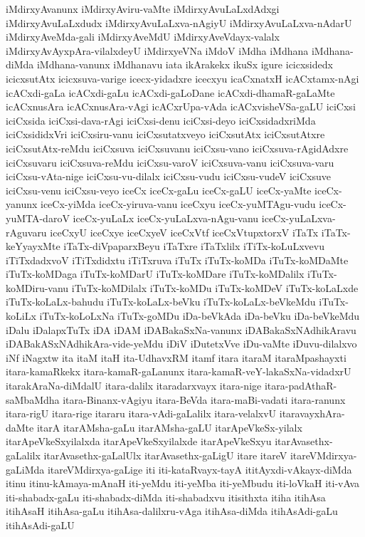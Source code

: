 {iMdirxyAvanunx
iMdirxyAviru-vaMte
iMdirxyAvuLaLxdAdxgi
iMdirxyAvuLaLxdudx
iMdirxyAvuLaLxva-nAgiyU
iMdirxyAvuLaLxva-nAdarU
iMdirxyAveMda-gali
iMdirxyAveMdU
iMdirxyAveVdayx-valalx
iMdirxyAvAyxpAra-vilalxdeyU
iMdirxyeVNa
iMdoV
iMdha
iMdhana
iMdhana-diMda
iMdhana-vanunx
iMdhanavu
iata
ikArakekx
ikuSx
igure
icicxsidedx
icicxsutAtx
icicxsuva-varige
icecx-yidadxre
icecxyu
icaCxnatxH
icACxtamx-nAgi
icACxdi-gaLa
icACxdi-gaLu
icACxdi-gaLoDane
icACxdi-dhamaR-gaLaMte
icACxnusAra
icACxnusAra-vAgi
icACxrUpa-vAda
icACxvisheVSa-gaLU
iciCxsi
iciCxsida
iciCxsi-dava-rAgi
iciCxsi-denu
iciCxsi-deyo
iciCxsidadxriMda
iciCxsididxVri
iciCxsiru-vanu
iciCxsutatxveyo
iciCxsutAtx
iciCxsutAtxre
iciCxsutAtx-reMdu
iciCxsuva
iciCxsuvanu
iciCxsu-vano
iciCxsuva-rAgidAdxre
iciCxsuvaru
iciCxsuva-reMdu
iciCxsu-varoV
iciCxsuva-vanu
iciCxsuva-varu
iciCxsu-vAta-nige
iciCxsu-vu-dilalx
iciCxsu-vudu
iciCxsu-vudeV
iciCxsuve
iciCxsu-venu
iciCxsu-veyo
iceCx
iceCx-gaLu
iceCx-gaLU
iceCx-yaMte
iceCx-yanunx
iceCx-yiMda
iceCx-yiruva-vanu
iceCxyu
iceCx-yuMTAgu-vudu
iceCx-yuMTA-daroV
iceCx-yuLaLx
iceCx-yuLaLxva-nAgu-vanu
iceCx-yuLaLxva-rAguvaru
iceCxyU
iceCxye
iceCxyeV
iceCxVtf
iceCxVtupxtorxV
iTaTx
iTaTx-keYyayxMte
iTaTx-diVpaparxBeyu
iTaTxre
iTaTxlilx
iTiTx-koLuLxvevu
iTiTxdadxvoV
iTiTxdidxtu
iTiTxruva
iTuTx
iTuTx-koMDa
iTuTx-koMDaMte
iTuTx-koMDaga
iTuTx-koMDarU
iTuTx-koMDare
iTuTx-koMDalilx
iTuTx-koMDiru-vanu
iTuTx-koMDilalx
iTuTx-koMDu
iTuTx-koMDeV
iTuTx-koLaLxde
iTuTx-koLaLx-bahudu
iTuTx-koLaLx-beVku
iTuTx-koLaLx-beVkeMdu
iTuTx-koLiLx
iTuTx-koLoLxNa
iTuTx-goMDu
iDa-beVkAda
iDa-beVku
iDa-beVkeMdu
iDalu
iDalapxTuTx
iDA
iDAM
iDABakaSxNa-vanunx
iDABakaSxNAdhikAravu
iDABakASxNAdhikAra-vide-yeMdu
iDiV
iDutetxVve
iDu-vaMte
iDuvu-dilalxvo
iNf
iNagxtw
ita
itaM
itaH
ita-UdhavxRM
itamf
itara
itaraM
itaraMpashayxti
itara-kamaRkekx
itara-kamaR-gaLanunx
itara-kamaR-veY-lakaSxNa-vidadxrU
itarakAraNa-diMdalU
itara-dalilx
itaradarxvayx
itara-nige
itara-padAthaR-saMbaMdha
itara-Binanx-vAgiyu
itara-BeVda
itara-maBi-vadati
itara-ranunx
itara-rigU
itara-rige
itararu
itara-vAdi-gaLalilx
itara-velalxvU
itaravayxhAra-daMte
itarA
itarAMsha-gaLu
itarAMsha-gaLU
itarApeVkeSx-yilalx
itarApeVkeSxyilalxda
itarApeVkeSxyilalxde
itarApeVkeSxyu
itarAvasethx-gaLalilx
itarAvasethx-gaLalUlx
itarAvasethx-gaLigU
itare
itareV
itareVMdirxya-gaLiMda
itareVMdirxya-gaLige
iti
iti-kataRvayx-tayA
ititAyxdi-vAkayx-diMda
itinu
itinu-kAmaya-mAnaH
iti-yeMdu
iti-yeMba
iti-yeMbudu
iti-loVkaH
iti-vAva
iti-shabadx-gaLu
iti-shabadx-diMda
iti-shabadxvu
itisithxta
itiha
itihAsa
itihAsaH
itihAsa-gaLu
itihAsa-dalilxru-vAga
itihAsa-diMda
itihAsAdi-gaLu
itihAsAdi-gaLU
}
